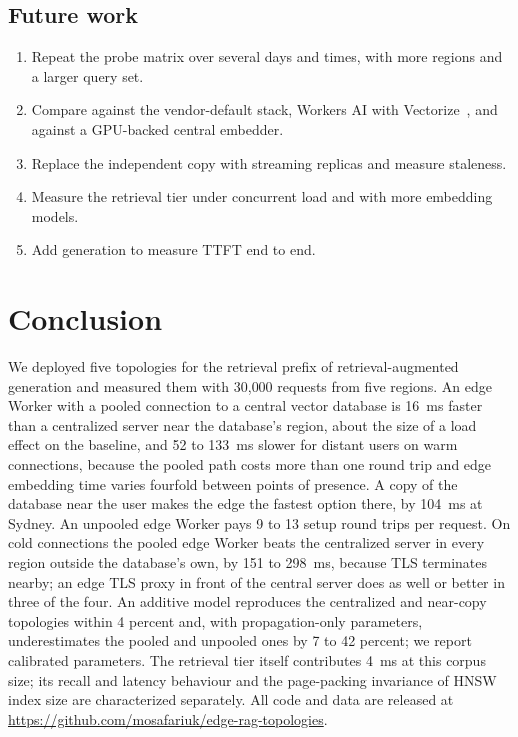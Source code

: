 \documentclass[conference]{IEEEtran}
\begin{document}
\subsection{Future work}
\begin{enumerate}
\item Repeat the probe matrix over several days and times, with more regions and a larger query
set.
\item Compare against the vendor-default stack, Workers AI with
Vectorize~\cite{cfragtutorial,cfvectorize}, and against a GPU-backed central embedder.
\item Replace the independent copy with streaming replicas and measure staleness.
\item Measure the retrieval tier under concurrent load and with more embedding models.
\item Add generation to measure TTFT end to end.
\end{enumerate}

\section{Conclusion}
We deployed five topologies for the retrieval prefix of retrieval-augmented generation and
measured them with 30{,}000 requests from five regions. An edge Worker with a pooled connection to
a central vector database is 16~ms faster than a centralized server near the database's region, about the size of a
load effect on the baseline, and 52 to 133~ms slower for distant users on warm connections,
because the pooled path costs more than one round trip and edge embedding time varies fourfold
between points of presence. A copy of the database near the user makes the edge the fastest option
there, by 104~ms at Sydney. An unpooled edge Worker pays 9 to 13 setup round trips per request. On
cold connections the pooled edge Worker beats the centralized server in every region outside the
database's own, by 151 to 298~ms, because TLS terminates nearby; an edge TLS proxy in front of the
central server does as well or better in three of the four. An additive model reproduces the
centralized and near-copy topologies within 4 percent and, with propagation-only parameters,
underestimates the pooled and unpooled ones by 7 to 42 percent; we report calibrated parameters. The retrieval tier itself contributes 4~ms at this corpus size; its recall and
latency behaviour and the page-packing invariance of HNSW index size are characterized separately.
All code and data are released at
\url{https://github.com/mosafariuk/edge-rag-topologies}.
\end{document}
